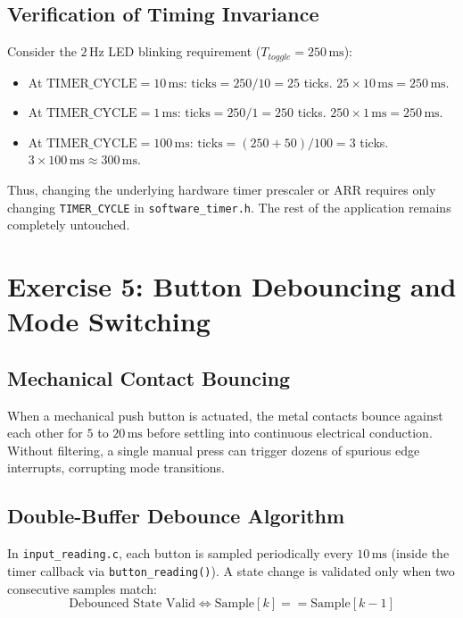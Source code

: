 \documentclass{hcmut-report}
\begin{document}
\subsection{Verification of Timing Invariance}
Consider the $2\,\text{Hz}$ LED blinking requirement ($T_{toggle} = 250\,\text{ms}$):
\begin{itemize}
    \item At $\text{TIMER\_CYCLE} = 10\,\text{ms}$: $\text{ticks} = 250 / 10 = 25$ ticks. $25 \times 10\,\text{ms} = 250\,\text{ms}$.
    \item At $\text{TIMER\_CYCLE} = 1\,\text{ms}$: $\text{ticks} = 250 / 1 = 250$ ticks. $250 \times 1\,\text{ms} = 250\,\text{ms}$.
    \item At $\text{TIMER\_CYCLE} = 100\,\text{ms}$: $\text{ticks} = (250 + 50) / 100 = 3$ ticks. $3 \times 100\,\text{ms} \approx 300\,\text{ms}$.
\end{itemize}
Thus, changing the underlying hardware timer prescaler or ARR requires only changing \texttt{TIMER\_CYCLE} in \texttt{software\_timer.h}. The rest of the application remains completely untouched.


\newpage
\section{Exercise 5: Button Debouncing and Mode Switching}

\subsection{Mechanical Contact Bouncing}
When a mechanical push button is actuated, the metal contacts bounce against each other for $5$ to $20\,\text{ms}$ before settling into continuous electrical conduction. Without filtering, a single manual press can trigger dozens of spurious edge interrupts, corrupting mode transitions.

\subsection{Double-Buffer Debounce Algorithm}
In \texttt{input\_reading.c}, each button is sampled periodically every $10\,\text{ms}$ (inside the timer callback via \texttt{button\_reading()}). A state change is validated only when two consecutive samples match:
\begin{equation}
    \text{Debounced State Valid} \iff \text{Sample}[k] == \text{Sample}[k-1]
\end{equation}
\end{document}
